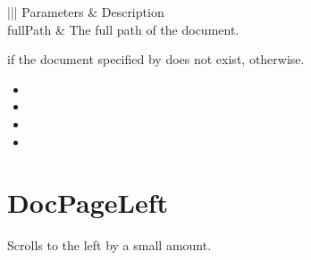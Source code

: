 \documentclass[letterpaper,12pt,english,openany,oneside]{sphinxmanual}
\begin{document}

\begin{sphinxVerbatim}[commandchars=\\\{\}]
\PYG{p}{[} \PYG{p}{]}
\end{sphinxVerbatim}
\label{\detokenize{IAC_API_DDE_Messages:parameters-7}}


\begin{savenotes}\sphinxattablestart
\centering
{}\label{\detokenize{IAC_API_DDE_Messages:section-7}}\nobreak
\begin{tabular}[t]{|||}
\hline
\sphinxstyletheadfamily 
Parameters
&\sphinxstyletheadfamily 
Description
\\
\hline
fullPath
&
The full path of the document.
\\
\hline
\end{tabular}
\par
\sphinxattableend\end{savenotes}


 if the document specified by  does not exist,  otherwise.

\label{\detokenize{IAC_API_DDE_Messages:related-methods-8}}
\begin{itemize}
\item {} 

\item {} 

\item {} 

\item {} 

\end{itemize}




\section{DocPageLeft}
\label{\detokenize{IAC_API_DDE_Messages:id26}}
Scrolls to the left by a small amount.
\end{document}
